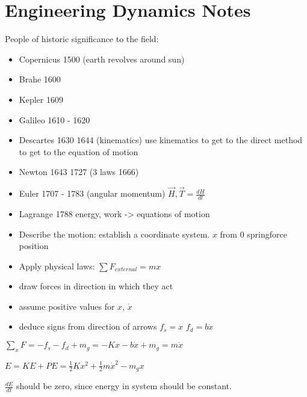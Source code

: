 \section{Engineering Dynamics Notes}

People of historic significance to the field:
\begin{itemize}
\item Copernicus 1500 (earth revolves around sun)
\item Brahe 1600
\item Kepler 1609
\item Galileo 1610 - 1620
\item Descartes 1630 1644 (kinematics) use kinematics to get to the direct method to get to the equation of motion
\item Newton 1643 1727 (3 laws 1666)
\item Euler 1707 - 1783 (angular momentum) $\vec{H}, \vec{T} = \frac{dH}{dt}$
\item Lagrange 1788 energy, work -> equations of motion
\end{itemize}

\begin{tikzpicture}
  
\end{tikzpicture}


\begin{itemize}
  \item Describe the motion: establish a coordinate system. $x$ from $0$ springforce position
  \item Apply physical laws: $\sum F_{external} = mx$
\end{itemize}    

\begin{itemize}
  \item draw forces in direction in which they act
  \item assume positive values for $x$, $\dot{x}$
  \item deduce signs from direction of arrows
      $f_s = x$
      $f_d = b\dot{x}$
\end{itemize}

$\sum_x F = -f_s - f_d + m_g = -Kx - b\dot{x} + m_g = m\ddot{x}$ 

\begin{tikzpicture}
  
\end{tikzpicture}

$E = KE + PE = \frac{1}{2}Kx^2+\frac{1}{2}m\dot{x}^2-m_g x$

$\frac{dE}{dt}$ should be zero, since energy in system should be constant.

